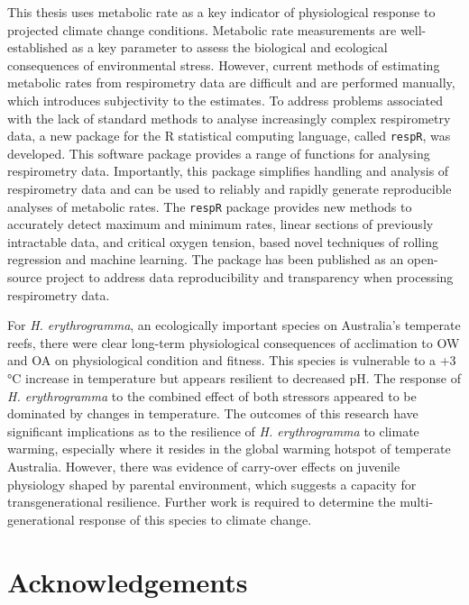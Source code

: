\documentclass[a4paper,10pt, oneside]{memoir}
\begin{document}
This thesis uses metabolic rate as a key indicator of physiological response to projected climate change conditions.
Metabolic rate measurements are well-established as a key parameter to assess the biological and ecological consequences of environmental stress.
However, current methods of estimating metabolic rates from respirometry data are difficult and are performed manually, which introduces subjectivity to the estimates.
To address problems associated with the lack of standard methods to analyse increasingly complex respirometry data, a new package for the R statistical computing language, called \texttt{respR}, was developed.
This software package provides a range of functions for analysing respirometry data.
Importantly, this package simplifies handling and analysis of respirometry data and can be used to reliably and rapidly generate reproducible analyses of metabolic rates.
The \texttt{respR} package provides new methods to accurately detect maximum and minimum rates, linear sections of previously intractable data, and critical oxygen tension, based novel techniques of rolling regression and machine learning.
The package has been published as an open-source project to address data reproducibility and transparency when processing respirometry data.

For \emph{H. erythrogramma}, an ecologically important species on Australia's temperate reefs, there were clear long-term physiological consequences of acclimation to OW and OA on physiological condition and fitness.
This species is vulnerable to a +3 °C increase in temperature but appears resilient to decreased pH.
The response of \emph{H. erythrogramma} to the combined effect of both stressors appeared to be dominated by changes in temperature.
The outcomes of this research have significant implications as to the resilience of \emph{H. erythrogramma} to climate warming, especially where it resides in the global warming hotspot of temperate Australia.
However, there was evidence of carry-over effects on juvenile physiology shaped by parental environment, which suggests a capacity for transgenerational resilience.
Further work is required to determine the multi-generational response of this species to climate change.

\cleardoublepage

\hypertarget{acknowledgements}{%
\chapter{Acknowledgements}\label{acknowledgements}}
\end{document}

